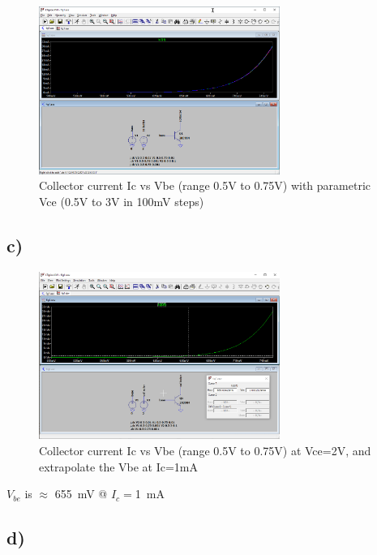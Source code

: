 \documentclass{article}
\begin{document}
	\begin{figure}[H]
	    \centering
	    \includegraphics[width=0.7\textwidth]{1b}
	    \caption{Collector current Ic vs Vbe (range 0.5V to 0.75V) with parametric Vce (0.5V to 3V in 100mV steps)}
	\end{figure}
	
	\subsection*{c)}

	\begin{figure}[H]
	    \centering
	    \includegraphics[width=0.7\textwidth]{1c}
	    \caption{Collector current Ic vs Vbe (range 0.5V to 0.75V) at Vce=2V, and extrapolate the Vbe at Ic=1mA}
	\end{figure}
	
	$V_{be}$ is $\approx$ \SI{655}{\milli\volt} @ $I_c = $\SI{1}{\mA}
	
	\subsection*{d)}
\end{document}
